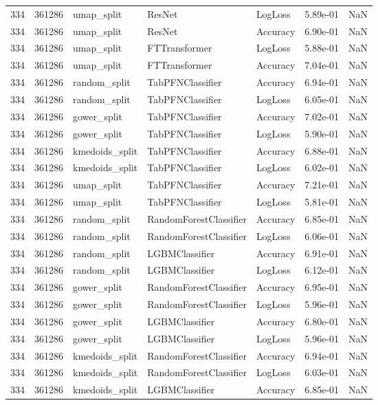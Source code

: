 \begin{tabular}{rrlllrr}
334 & 361286 & umap\_split & ResNet & LogLoss & 5.89e-01 & NaN \\
334 & 361286 & umap\_split & ResNet & Accuracy & 6.90e-01 & NaN \\
334 & 361286 & umap\_split & FTTransformer & LogLoss & 5.88e-01 & NaN \\
334 & 361286 & umap\_split & FTTransformer & Accuracy & 7.04e-01 & NaN \\
334 & 361286 & random\_split & TabPFNClassifier & Accuracy & 6.94e-01 & NaN \\
334 & 361286 & random\_split & TabPFNClassifier & LogLoss & 6.05e-01 & NaN \\
334 & 361286 & gower\_split & TabPFNClassifier & Accuracy & 7.02e-01 & NaN \\
334 & 361286 & gower\_split & TabPFNClassifier & LogLoss & 5.90e-01 & NaN \\
334 & 361286 & kmedoids\_split & TabPFNClassifier & Accuracy & 6.88e-01 & NaN \\
334 & 361286 & kmedoids\_split & TabPFNClassifier & LogLoss & 6.02e-01 & NaN \\
334 & 361286 & umap\_split & TabPFNClassifier & Accuracy & 7.21e-01 & NaN \\
334 & 361286 & umap\_split & TabPFNClassifier & LogLoss & 5.81e-01 & NaN \\
334 & 361286 & random\_split & RandomForestClassifier & Accuracy & 6.85e-01 & NaN \\
334 & 361286 & random\_split & RandomForestClassifier & LogLoss & 6.06e-01 & NaN \\
334 & 361286 & random\_split & LGBMClassifier & Accuracy & 6.91e-01 & NaN \\
334 & 361286 & random\_split & LGBMClassifier & LogLoss & 6.12e-01 & NaN \\
334 & 361286 & gower\_split & RandomForestClassifier & Accuracy & 6.95e-01 & NaN \\
334 & 361286 & gower\_split & RandomForestClassifier & LogLoss & 5.96e-01 & NaN \\
334 & 361286 & gower\_split & LGBMClassifier & Accuracy & 6.80e-01 & NaN \\
334 & 361286 & gower\_split & LGBMClassifier & LogLoss & 5.96e-01 & NaN \\
334 & 361286 & kmedoids\_split & RandomForestClassifier & Accuracy & 6.94e-01 & NaN \\
334 & 361286 & kmedoids\_split & RandomForestClassifier & LogLoss & 6.03e-01 & NaN \\
334 & 361286 & kmedoids\_split & LGBMClassifier & Accuracy & 6.85e-01 & NaN \\

\end{tabular}
